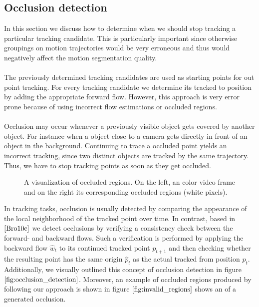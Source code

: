 \subsection{Occlusion detection}
\label{sec:occlusion_det}
In this section we discuss how to determine when we should stop tracking a particular tracking candidate. This is particularly important since otherwise groupings on motion trajectories would be very erroneous and thus would negatively affect the motion segmentation quality. \\ \\
The previously determined tracking candidates are used as starting points for out point tracking. For every tracking candidate we determine its tracked to position by adding the appropriate forward flow. However, this approach is very error prone because of using incorrect flow estimations or occluded regions. \\ \\
Occlusion may occur whenever a previously visible object gets covered by another object. For instance when a object close to a camera gets directly in front of an object in the background. Continuing to trace a occluded point yields an incorrect tracking, since two distinct objects are tracked by the same trajectory. Thus, we have to stop tracking points as soon as they get occluded.
\begin{figure}[H]
\begin{center}
\end{center}
\caption[Occluded Regions]{A visualization of occluded regions. On the left, an color video frame and on the right its corresponding occluded regions (white pixels).}
\label{fig:invalid_regions}
\end{figure}
In tracking tasks, occlusion is usually detected by comparing the appearance of the local neighborhood of the tracked point over time. In contrast, based in  $\cite{Bro10c}$ we detect occlusions by verifying a consistency check between the forward- and backward flows. Such a verification is performed by applying the backward flow $\hat{w}_t$ to its continued tracked point $p_{t+1}$ and then checking whether the resulting point has the same origin $\hat{p}_t$ as the actual tracked from position $p_t$. Additionally, we visually outlined this concept of occlusion detection in figure $\ref{fig:occlusion_detection}$. Moreover, an example of occluded regions produced by following our approach is shown in figure $\ref{fig:invalid_regions}$ shows an of a generated occlusion.
